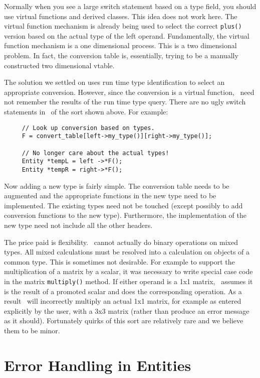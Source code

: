 \documentclass{report}
\begin{document}
Normally when you see a large switch statement based on a type field, you should use virtual
functions and derived classes. This idea does not work here. The virtual function mechanism is
already being used to select the correct \texttt{plus()} version based on the actual type of the
left operand. Fundamentally, the virtual function mechanism is a one dimensional process. This
is a two dimensional problem. In fact, the conversion table is, essentially, trying to be a
manually constructed two dimensional vtable.

The solution we settled on uses run time type identification to select an appropriate
conversion. However, since the conversion is a virtual function, \CLAC\ need not remember the
results of the run time type query. There are no ugly switch statements in \CLAC\ of the sort
shown above. For example:

\begin{verbatim}
     // Look up conversion based on types.
     F = convert_table[left->my_type()][right->my_type()];

     // No longer care about the actual types!
     Entity *tempL = left ->*F();
     Entity *tempR = right->*F();
\end{verbatim}

Now adding a new type is fairly simple. The conversion table needs to be augmented and the
appropriate functions in the new type need to be implemented. The existing types need not be
touched (except possibly to add conversion functions to the new type). Furthermore, the
implementation of the new type need not include all the other headers.

The price paid is flexibility. \CLAC\ cannot actually do binary operations on mixed types. All
mixed calculations must be resolved into a calculation on objects of a common type. This is
sometimes not desirable. For example to support the multiplication of a matrix by a scalar, it
was necessary to write special case code in the matrix \texttt{multiply()} method. If either
operand is a 1x1 matrix, \CLAC\ assumes it is the result of a promoted scalar and does the
corresponding operation. As a result \CLAC\ will incorrectly multiply an actual 1x1 matrix, for
example as entered explicitly by the user, with a 3x3 matrix (rather than produce an error
message as it should). Fortunately quirks of this sort are relatively rare and we believe them
to be minor.

\section{Error Handling in Entities}
\end{document}
